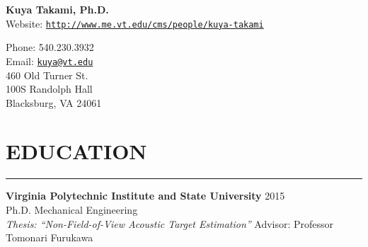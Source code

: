\documentclass[11pt,letterpaper]{article}
\def\name{\bf Kuya Takami, Ph.D.}
\begin{document}
\rhead{}
\begin{minipage}{0.7\linewidth}
{\Huge \name}\\

\vspace{5mm}\hspace{4mm}
Website:  \href{http://www.me.vt.edu/cms/people/kuya-takami}{\tt http://www.me.vt.edu/cms/people/kuya-takami} \\
\end{minipage}
\hspace{2mm}
\begin{minipage}{0.6\linewidth} 
      Phone:  540.230.3932\\
	Email:  \href{mailto:kuya@vt.edu}{\tt kuya@vt.edu} \\
    460 Old Turner St.\\
  100S Randolph Hall\\
   Blacksburg, VA 24061\\
\end{minipage}

\section*{EDUCATION}\vspace{-3mm}
\hrule
\begin{minipage}{\columnwidth}
{\bf Virginia Polytechnic Institute and State University}\hspace{1mm} 2015\\
\hspace{5mm}Ph.D.  Mechanical Engineering   \\
\hspace{10mm}
{\it Thesis: ``Non-Field-of-View Acoustic Target Estimation''} Advisor: Professor Tomonari Furukawa
\end{minipage}
\end{document}
